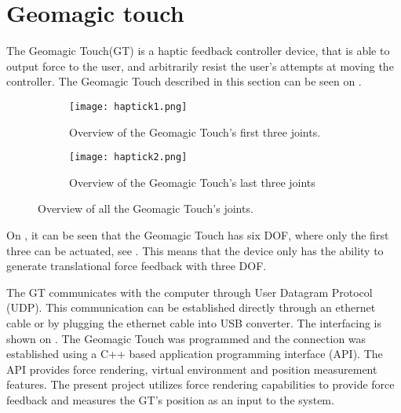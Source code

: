 \section{Geomagic touch}\label{sec:geo_magic}
The Geomagic Touch(GT) is a haptic feedback controller device, %
that is able to output force to the user, and arbitrarily resist the user's attempts at moving the controller.
	 The Geomagic Touch described in this section can be seen on .

\begin{figure}[H]
	\centering
	\begin{subfigure}{.45\textwidth}
		\centering
		\texttt{[image: haptick1.png]}
		\caption{Overview of the Geomagic Touch's first three joints.}
		\label{fig:phantom1}
	\end{subfigure}
	\begin{subfigure}{.45\textwidth}
		\centering
		\texttt{[image: haptick2.png]}
		\caption{Overview of the Geomagic Touch's last three joints}
		\label{fig:phantom2}
	\end{subfigure}
\caption{Overview of all the Geomagic Touch's joints.}
\label{fig:phantom_omni}
\end{figure}

 On , it can be seen that the Geomagic Touch has six \gls{DOF}, where only the first three can be actuated, see . This means that the device only has the ability to generate translational force feedback with three \gls{DOF}.%

The GT communicates with the computer through User Datagram Protocol (UDP). This communication can be established directly through an ethernet cable or by plugging the ethernet cable into USB converter. The interfacing is shown on . The Geomagic Touch was programmed and the connection was established using a C++ based application programming interface (API). The API provides force rendering,  virtual environment and position measurement features. The present project utilizes force rendering capabilities to provide force feedback and measures the GT's position as an input to the system.